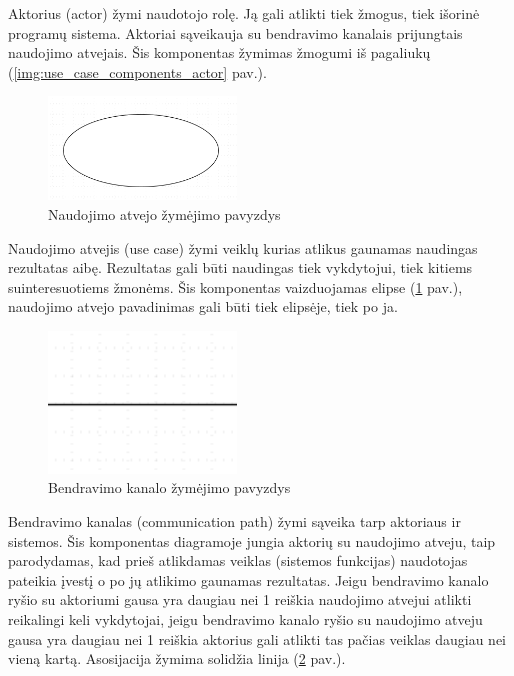 Aktorius (actor) žymi naudotojo rolę. Ją gali atlikti tiek žmogus, tiek išorinė programų sistema. Aktoriai sąveikauja su bendravimo kanalais prijungtais naudojimo atvejais. Šis komponentas žymimas žmogumi iš pagaliukų (\ref{img:use_case_components_actor} pav.).

\begin{figure}[H]
	\centering
	\includegraphics[width=5cm]{img/use_case_components/use_case}
	\caption{Naudojimo atvejo žymėjimo pavyzdys}
	\label{img:use_case_components_use_case}
\end{figure}

Naudojimo atvejis (use case) žymi veiklų kurias atlikus gaunamas naudingas rezultatas aibę. Rezultatas gali būti naudingas tiek vykdytojui, tiek kitiems suinteresuotiems žmonėms. Šis komponentas vaizduojamas elipse (\ref{img:use_case_components_use_case} pav.),
naudojimo atvejo pavadinimas gali būti tiek elipsėje, tiek po ja.

\begin{figure}[H]
	\centering
	\includegraphics[width=5cm]{img/use_case_components/association}
	\caption{Bendravimo kanalo žymėjimo pavyzdys}
	\label{img:use_case_components_communication_path}
\end{figure}

Bendravimo kanalas (communication path) žymi sąveika tarp aktoriaus ir sistemos. Šis komponentas diagramoje jungia aktorių su naudojimo atveju, taip parodydamas, kad prieš atlikdamas veiklas (sistemos funkcijas) naudotojas pateikia įvestį o po jų atlikimo gaunamas rezultatas. Jeigu bendravimo kanalo ryšio su aktoriumi gausa yra daugiau nei 1 reiškia naudojimo atvejui atlikti reikalingi keli vykdytojai, jeigu bendravimo kanalo ryšio su naudojimo atveju gausa yra daugiau nei 1 reiškia aktorius gali atlikti tas pačias veiklas daugiau nei vieną kartą. Asosijacija žymima solidžia linija (\ref{img:use_case_components_communication_path} pav.).

